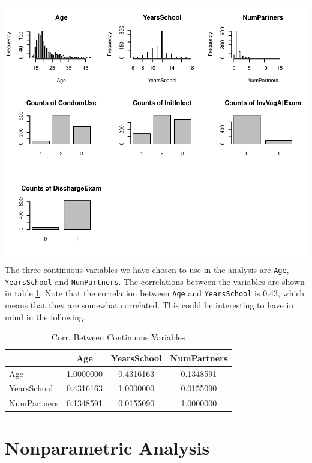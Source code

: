\documentclass[
]{article}
\begin{document}
\includegraphics{practical_files/figure-latex/EDA-plots-1.pdf}
The three continuous variables we have chosen to use in the analysis are \texttt{Age}, \texttt{YearsSchool} and \texttt{NumPartners}. The correlations between the variables are shown in table \ref{tab:correlations}. Note that the correlation between \texttt{Age} and \texttt{YearsSchool} is 0.43, which means that they are somewhat correlated. This could be interesting to have in mind in the following.

\begin{table}

\caption{\label{tab:correlations}Corr. Between Continuous Variables}
\centering
\begin{tabular}[t]{l|c|c|c}
\hline
  & Age & YearsSchool & NumPartners\\
\hline
Age & 1.0000000 & 0.4316163 & 0.1348591\\
\hline
YearsSchool & 0.4316163 & 1.0000000 & 0.0155090\\
\hline
NumPartners & 0.1348591 & 0.0155090 & 1.0000000\\
\hline
\end{tabular}
\end{table}

\hypertarget{nonparametric-analysis}{%
\section{Nonparametric Analysis}\label{nonparametric-analysis}}
\end{document}
